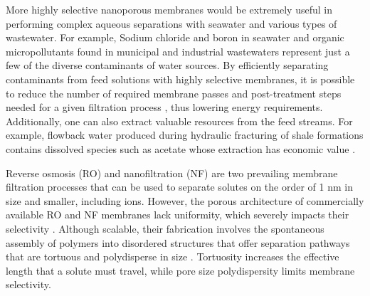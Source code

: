 \documentclass[journal=jpcbfk,manuscript=article]{achemso}
\begin{document}

  More highly selective nanoporous membranes would be extremely useful 
  in performing complex aqueous separations with seawater and various 
  types of wastewater. For example, Sodium chloride and boron in seawater
  \cite{fritzmann_state---art_2007} and organic micropollutants found in
  municipal and industrial wastewaters \cite{schwarzenbach_challenge_2006} represent
  just a few of the diverse contaminants of water sources. By efficiently
  separating contaminants from feed solutions with highly selective membranes,
  it is possible to reduce the number of required membrane passes and post-treatment steps
  needed for a given filtration process \cite{werber_materials_2016}, thus
  lowering energy requirements. Additionally, one can also extract valuable resources
  from the feed streams. For example, flowback water produced during hydraulic
  fracturing of shale formations contains dissolved species such as acetate whose
  extraction has economic value \cite{dischinger_application_2017}.  



  Reverse osmosis (RO) and nanofiltration (NF) are two prevailing membrane
  filtration processes that can be used to separate solutes on the order of 1 nm
  in size and smaller, including 
  ions. However, the porous architecture of
  commercially available RO and NF membranes lack uniformity, which severely impacts their
  selectivity \cite{van_der_bruggen_review_2003}. Although scalable, their
  fabrication involves the spontaneous assembly of polymers into disordered
  structures that offer separation pathways that are tortuous and polydisperse
  in size \cite{werber_materials_2016}. Tortuosity increases the effective
  length that a solute must travel, while pore size polydispersity limits membrane
  selectivity.
\end{document}
